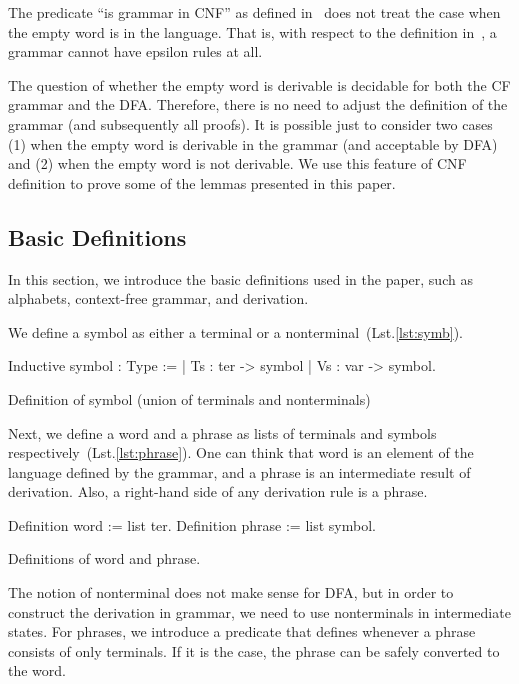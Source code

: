 The predicate ``is grammar in CNF'' as defined in~\cite{smolkaHofmann2016} does not treat the case when the empty word is in the language. That is, with respect to the definition in~\cite{smolkaHofmann2016}, a grammar cannot have epsilon rules at all.

The question of whether the empty word is derivable is decidable for both the CF grammar and the DFA. Therefore, there is no need to adjust the definition of the grammar (and subsequently all proofs). It is possible just to consider two cases (1) when the empty word is derivable in the grammar (and acceptable by DFA) and (2) when the empty word is not derivable. We use this feature of CNF definition to prove some of the lemmas presented in this paper.

\subsection{Basic Definitions}

In this section, we introduce the basic definitions used in the paper, such as alphabets, context-free grammar, and derivation.

We define a symbol as either a terminal or a nonterminal~(Lst.\ref{lst:symb}).

\begin{listing}[h]
    \begin{pyglist}[language=coq, numbers=none, numbersep=5pt]
  Inductive symbol : Type :=
    | Ts : ter -> symbol
    | Vs : var -> symbol.
    \end{pyglist}
    \caption{Definition of symbol (union of terminals and nonterminals)}
    \label{lst:symb}
\end{listing}

Next, we define a word and a phrase as lists of terminals and symbols respectively~(Lst.\ref{lst:phrase}).
One can think that word is an element of the language defined by the grammar, and a phrase is an intermediate result of derivation.
Also, a right-hand side of any derivation rule is a phrase.

\begin{listing}[h]
    \begin{pyglist}[language=coq, numbers=none, numbersep=5pt]
  Definition word := list ter.
  Definition phrase := list symbol.
    \end{pyglist}
    \caption{Definitions of word and phrase.}
    \label{lst:phrase}
\end{listing}

The notion of nonterminal does not make sense for DFA, but in order to construct the derivation in grammar, we need to use nonterminals in intermediate states. For phrases, we introduce a predicate that defines whenever a phrase consists of only terminals. If it is the case, the phrase can be safely converted to the word.

